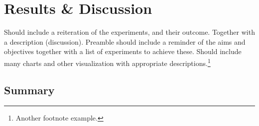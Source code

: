 \chapter{Results \& Discussion}

Should include a reiteration of the experiments, and their outcome.  Together with a description (discussion).  Preamble should include a reminder of the aims and objectives together with a list of experiments to achieve these.  Should include many charts and other visualization with appropriate descriptions.\footnote{Another footnote example.}  

\blindtext

\section{Summary}

\blindtext